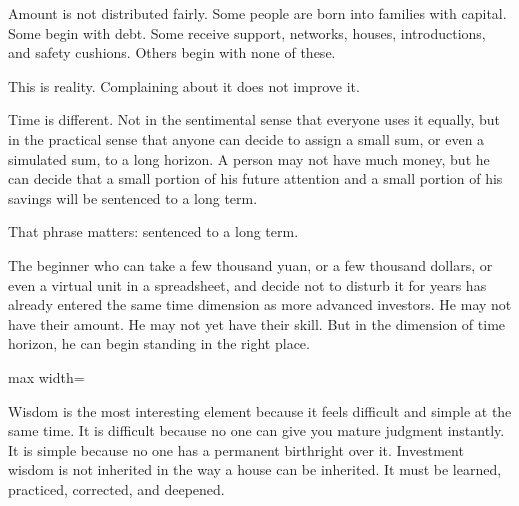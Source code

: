 Amount is not distributed fairly. Some people are born into families with capital. Some begin with debt. Some receive support, networks, houses, introductions, and safety cushions. Others begin with none of these.

This is reality. Complaining about it does not improve it.

Time is different. Not in the sentimental sense that everyone uses it equally, but in the practical sense that anyone can decide to assign a small sum, or even a simulated sum, to a long horizon. A person may not have much money, but he can decide that a small portion of his future attention and a small portion of his savings will be sentenced to a long term.

That phrase matters: sentenced to a long term.

The beginner who can take a few thousand yuan, or a few thousand dollars, or even a virtual unit in a spreadsheet, and decide not to disturb it for years has already entered the same time dimension as more advanced investors. He may not have their amount. He may not yet have their skill. But in the dimension of time horizon, he can begin standing in the right place.

\begin{center}
\begin{adjustbox}{max width=\linewidth}
\end{adjustbox}
\end{center}

Wisdom is the most interesting element because it feels difficult and simple at the same time. It is difficult because no one can give you mature judgment instantly. It is simple because no one has a permanent birthright over it. Investment wisdom is not inherited in the way a house can be inherited. It must be learned, practiced, corrected, and deepened.

